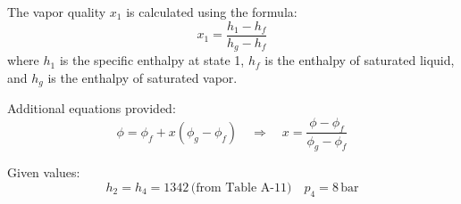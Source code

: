 The vapor quality \( x_1 \) is calculated using the formula:  
\[
x_1 = \frac{h_1 - h_f}{h_g - h_f}
\]  
where \( h_1 \) is the specific enthalpy at state 1, \( h_f \) is the enthalpy of saturated liquid, and \( h_g \) is the enthalpy of saturated vapor.  

Additional equations provided:  
\[
\phi = \phi_f + x (\phi_g - \phi_f) \quad \Rightarrow \quad x = \frac{\phi - \phi_f}{\phi_g - \phi_f}
\]  

Given values:  
\[
h_2 = h_4 = 1342 \, \text{(from Table A-11)} \quad p_4 = 8 \, \text{bar}
\]